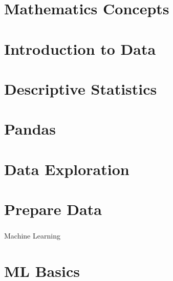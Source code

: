 

 \section[Maths]{Mathematics Concepts}
 

 \section[DataIntro]{Introduction to Data}
 
 


 \section[Descr]{Descriptive Statistics}
 



 \section[Pandas]{Pandas}
 

 \section[EDA]{Data Exploration}
 

 \section[Prep]{Prepare Data}
 

 \begin{frame}[fragile]\frametitle{}
 \begin{center}
 {\Huge Machine Learning}
 \end{center}
 \end{frame}

 \section[ML Basics]{ML Basics}





